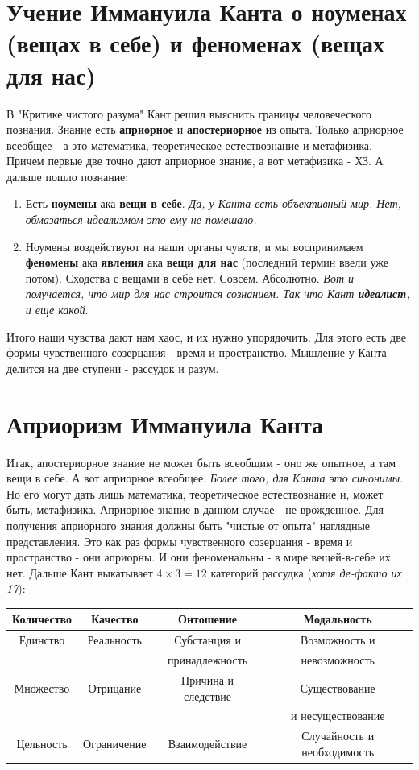 \section{Учение Иммануила Канта о ноуменах (вещах в себе) и феноменах (вещах для нас)}
В "Критике чистого разума" Кант решил выяснить границы человеческого познания. Знание есть \textbf{априорное} и \textbf{апостериорное} из опыта. Только априорное всеобщее - а это математика, теоретическое естествознание и метафизика. Причем первые две точно дают априорное знание, а вот метафизика - ХЗ. А дальше пошло познание:
\begin{enumerate}
\item Есть \textbf{ноумены} ака \textbf{вещи в себе}. \textit{Да, у Канта есть объективный мир. Нет, обмазаться идеализмом это ему не помешало.}
\item Ноумены воздействуют на наши органы чувств, и мы воспринимаем \textbf{феномены} ака \textbf{явления} ака \textbf{вещи для нас} (последний термин ввели уже потом). Сходства с вещами в себе нет. Совсем. Абсолютно. \textit{Вот и получается, что мир для нас строится сознанием. Так что Кант \textbf{идеалист}, и еще какой}.
\end{enumerate} 
Итого наши чувства дают нам хаос, и их нужно упорядочить. Для этого есть две формы чувственного созерцания - время и пространство. Мышление у Канта делится на две ступени - рассудок и разум.

\section{Априоризм Иммануила Канта}
Итак, апостериорное знание не может быть всеобщим - оно же опытное, а там вещи в себе. А вот априорное всеобщее. \textit{Более того, для Канта это синонимы}. Но его могут дать лишь математика, теоретическое естествознание и, может быть, метафизика. Априорное знание в данном случае - не врожденное. Для получения априорного знания должны быть "чистые от опыта" наглядные представления. Это как раз формы чувственного созерцания - время и пространство - они априорны. И они феноменальны - в мире вещей-в-себе их нет. Дальше Кант выкатывает $4\times3=12$ категорий рассудка (\textit{хотя де-факто их 17}): 

\begin{tabular}{|c|c|c|c|}
\hline
\textbf{Количество}& \textbf{Качество}& \textbf{Онтошение}& \textbf{Модальность}\\
\hline
Единство&Реальность&Субстанция и &Возможность и\\
&&принадлежность& невозможность\\
\hline
Множество&Отрицание&Причина и следствие&Существование \\&&&и несуществование\\
\hline
Цельность&Ограничение&Взаимодействие&Случайность и необходимость\\
\hline
\end{tabular}

